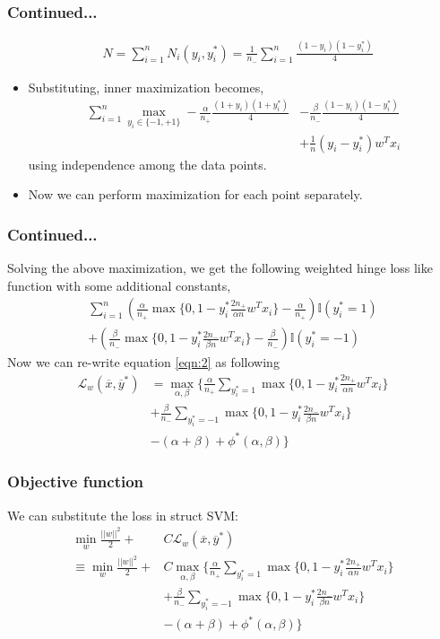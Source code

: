 \documentclass{beamer}
\begin{document}
\begin{frame}
	\frametitle{Continued...}
	\begin{align*}
	&N = \sum_{i=1}^nN_i(y_i,y_i^*)= \frac{1}{n_-}\sum_{i=1}^n\frac{(1-y_i)(1-y_i^*)}{4}
	\end{align*}
	\begin{itemize}
	\item Substituting, inner maximization becomes,
	\begin{align*}
	\sum_{i=1}^n\max_{y_i\in\{-1,+1\}}-\frac{\alpha}{n_+}\frac{(1+y_i)(1+y_i^*)}{4} &-\frac{\beta}{n_-}\frac{(1-y_i)(1-y_i^*)}{4} \\
	&+ \frac{1}{n}(y_i - y_i^*)w^Tx_i
	\end{align*}
	using independence among the data points.
	\item Now we can perform maximization for each point separately.
	\end{itemize}
\end{frame}
\begin{frame}
	\frametitle{Continued...}
	Solving the above maximization, we get the following weighted hinge loss like function with some additional constants,
	\begin{align*}
	\sum_{i=1}^n
	(\frac{\alpha}{n_+}\max\{0,1-y_i^*\frac{2n_+}{\alpha n}w^Tx_i\}
	- \frac{\alpha}{n_+})\mathbb{I}(y^*_i=1)\\
	+ (\frac{\beta}{n_-}\max\{0,1-y_i^*\frac{2n_-}{\beta n}w^Tx_i\}
	- \frac{\beta}{n_-})\mathbb{I}(y^*_i=-1)
	\end{align*}
	Now we can re-write equation \ref{eqn:2} as following
	\begin{align*}
	\mathcal L_w(\overline{x},\overline{y}^*)
	&= \max_{\alpha,\beta}\{
	\frac{\alpha}{n_+}\sum_{y_i^*=1}\max\{0,1-y_i^*\frac{2n_+}{\alpha n}w^Tx_i\}\\
	&+ \frac{\beta}{n_-}\sum_{y_i^*=-1}\max\{0,1-y_i^*\frac{2n_-}{\beta n}w^Tx_i\}\\
	&-(\alpha+\beta)+\phi^*(\alpha,\beta)\}
	\end{align*}
\end{frame}
\begin{frame}
	\frametitle{Objective function}
	We can substitute the loss in struct SVM:
	\begin{align*}
	\min_w \frac{||w||^2}{2} + & C \mathcal L_w(\overline{x},\overline{y}^*)\\
	\equiv \min_w \frac{||w||^2}{2} + & C\max_{\alpha,\beta}\{
	\frac{\alpha}{n_+}\sum_{y_i^*=1}\max\{0,1-y_i^*\frac{2n_+}{\alpha n}w^Tx_i\}\\
	&+ \frac{\beta}{n_-}\sum_{y_i^*=-1}\max\{0,1-y_i^*\frac{2n_-}{\beta n}w^Tx_i\}\\
	&-(\alpha+\beta)+\phi^*(\alpha,\beta)\}
	\end{align*}
\end{frame}
\end{document}
